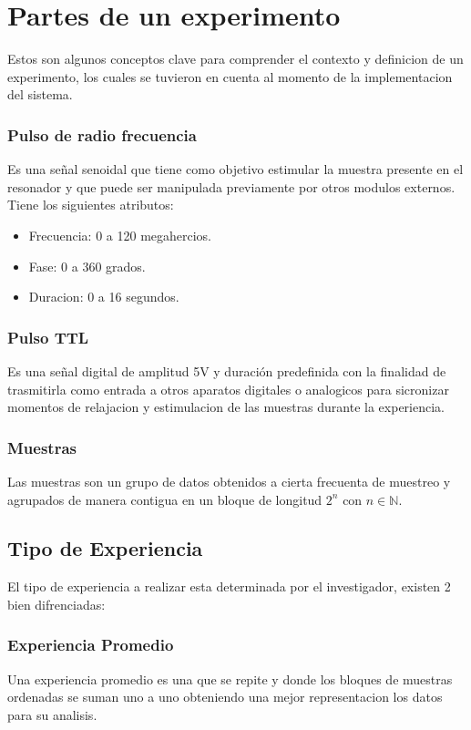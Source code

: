\section{Partes de un experimento}

Estos son algunos conceptos clave para comprender el contexto y definicion de un
experimento, los cuales se tuvieron en cuenta al momento de la implementacion 
del sistema.

\subsubsection{Pulso de radio frecuencia}
Es una señal senoidal que tiene como objetivo
estimular la muestra presente en el resonador
y que puede ser manipulada previamente
por otros modulos externos. Tiene los siguientes atributos:
    \begin{itemize}
        \item Frecuencia: 0 a 120 megahercios.
        \item Fase: 0 a 360 grados.
        \item Duracion: 0 a 16 segundos.
    \end{itemize}

\subsubsection{Pulso TTL}
Es una señal digital de amplitud 5V y duración predefinida con la finalidad de trasmitirla como entrada a otros aparatos digitales o analogicos para sicronizar momentos de relajacion y estimulacion de las muestras durante la experiencia.

\subsubsection{Muestras}
Las muestras son un grupo de datos obtenidos a cierta frecuenta de muestreo y agrupados de manera contigua 
en un bloque de longitud $2^{n}$ con $n \in \mathbb{N}$. 

\subsection{Tipo de Experiencia}
El tipo de experiencia a realizar esta determinada por el investigador, existen 2 bien difrenciadas:

\subsubsection{Experiencia Promedio}
Una experiencia promedio es una que se repite y donde los bloques de muestras ordenadas se suman uno a uno obteniendo
una mejor representacion los datos para su analisis.

